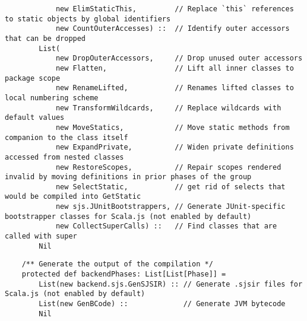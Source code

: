 \documentclass[letterpaper,12pt,titlepage,oneside,final]{book}
\begin{document}
\begin{verbatim}
			new ElimStaticThis,         // Replace `this` references to static objects by global identifiers
			new CountOuterAccesses) ::  // Identify outer accessors that can be dropped
		List(
			new DropOuterAccessors,     // Drop unused outer accessors
			new Flatten,                // Lift all inner classes to package scope
			new RenameLifted,           // Renames lifted classes to local numbering scheme
			new TransformWildcards,     // Replace wildcards with default values
			new MoveStatics,            // Move static methods from companion to the class itself
			new ExpandPrivate,          // Widen private definitions accessed from nested classes
			new RestoreScopes,          // Repair scopes rendered invalid by moving definitions in prior phases of the group
			new SelectStatic,           // get rid of selects that would be compiled into GetStatic
			new sjs.JUnitBootstrappers, // Generate JUnit-specific bootstrapper classes for Scala.js (not enabled by default)
			new CollectSuperCalls) ::   // Find classes that are called with super
		Nil
\end{verbatim}

\begin{verbatim}
	/** Generate the output of the compilation */
	protected def backendPhases: List[List[Phase]] =
		List(new backend.sjs.GenSJSIR) :: // Generate .sjsir files for Scala.js (not enabled by default)
		List(new GenBCode) ::             // Generate JVM bytecode
		Nil
\end{verbatim}
\end{document}
